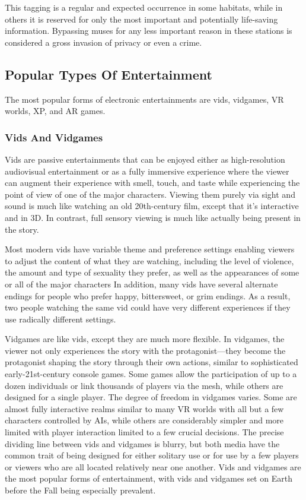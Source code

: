 This tagging is a regular and expected occurrence 
in some habitats, while in others it is reserved for 
only the most important and potentially life-saving 
information. Bypassing muses for any less important 
reason in these stations is considered a gross invasion
of privacy or even a crime.

\subsection{Popular Types Of Entertainment}

The most popular forms of electronic entertainments 
are vids, vidgames, VR worlds, XP, and AR games.

\subsubsection{Vids And Vidgames}

Vids are passive entertainments that can be enjoyed 
either as high-resolution audiovisual entertainment or 
as a fully immersive experience where the viewer can 
augment their experience with smell, touch, and taste 
while experiencing the point of view of one of the 
major characters. Viewing them purely via sight and 
sound is much like watching an old 20th-century film, 
except that it's interactive and in 3D. In contrast, full 
sensory viewing is much like actually being present in 
the story.

Most modern vids have variable theme and preference
settings enabling viewers to adjust the content of
what they are watching, including the level of violence, 
the amount and type of sexuality they prefer, as well 
as the appearances of some or all of the major characters
In addition, many vids have several alternate
endings for people who prefer happy, bittersweet, or 
grim endings. As a result, two people watching the 
same vid could have very different experiences if they 
use radically different settings.

Vidgames are like vids, except they are much more 
flexible. In vidgames, the viewer not only experiences 
the story with the protagonist—they become the protagonist
shaping the story through their own actions,
similar to sophisticated early-21st-century console 
games. Some games allow the participation of up to a 
dozen individuals or link thousands of players via the 
mesh, while others are designed for a single player. 
The degree of freedom in vidgames varies. Some are 
almost fully interactive realms similar to many VR 
worlds with all but a few characters controlled by AIs, 
while others are considerably simpler and more limited
with player interaction limited to a few crucial
decisions. The precise dividing line between vids and 
vidgames is blurry, but both media have the common 
trait of being designed for either solitary use or for 
use by a few players or viewers who are all located 
relatively near one another. Vids and vidgames are 
the most popular forms of entertainment, with vids 
and vidgames set on Earth before the Fall being especially
prevalent.


